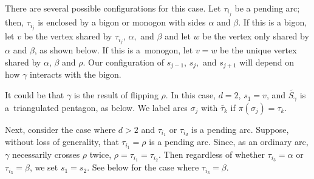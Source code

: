 \documentclass[pdftex]{sigma}%
\numberwithin{equation}{section}
\begin{document}
There are several possible configurations for this case. Let $\tau_{i_j}$ be a pending arc; then, $\tau_{i_j}$ is enclosed by a bigon or monogon with sides $\alpha$ and $\beta$. If this is a bigon, let $v$ be the vertex shared by $\tau_{i_j}$, $\alpha,$ and $\beta$ and let $w$ be the vertex only shared by $\alpha$ and $\beta$, as shown below. If this is a~monogon, let $v = w$ be the unique vertex shared by $\alpha$, $\beta$ and $\rho$. Our configuration of $s_{j-1}$, $s_j,$ and $s_{j+1}$ will depend on how $\gamma$ interacts with the bigon.

It could be that $\gamma$ is the result of flipping $\rho$. In this case, $d = 2$, $s_1 = v$, and $\widetilde{S_\gamma}$ is a~triangulated pentagon, as below. We label arcs $\sigma_j$ with $\widetilde{\tau_k}$ if $\pi(\sigma_j) = \tau_k$.

\begin{center}
\end{center}

Next, consider the case where $d > 2$ and $\tau_{i_1}$ or $\tau_{i_d}$ is a pending arc. Suppose, without loss of generality, that $\tau_{i_1} = \rho$ is a pending arc. Since, as an ordinary arc, $\gamma$ necessarily crosses $\rho$ twice, $\rho = \tau_{i_1} = \tau_{i_2}$. Then regardless of whether $\tau_{i_3} = \alpha$ or $\tau_{i_3} = \beta$, we set $s_1 = s_2 $. See below for the case where $\tau_{i_3} = \beta$.
\end{document}
